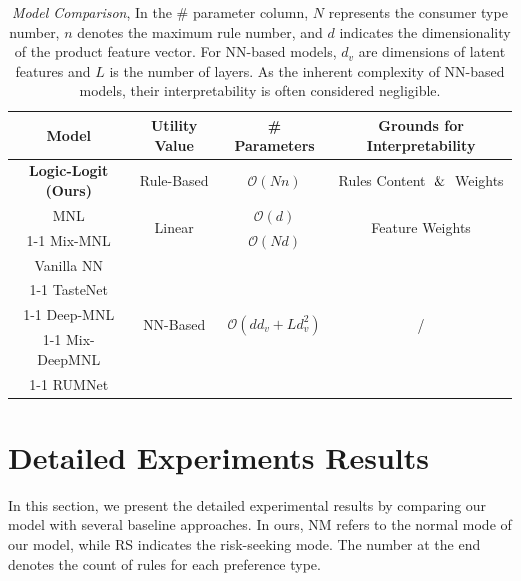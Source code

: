 \documentclass{article} %
\begin{document}
\begin{table}[ht]
\centering
\begin{tabular}{c|c|c|c} 
\toprule
Model & Utility Value  & \# Parameters & Grounds for Interpretability \\ 
\hline
\textbf{Logic-Logit (Ours)}  & Rule-Based & $\mathcal{O}(Nn)$ & Rules Content $\And$ Weights \\
\hline
MNL   & \multirow{2}{*}{Linear} & $\mathcal{O}(d)$ & \multirow{2}{*}{Feature Weights} \\
\cline{1-1} \cline{3-3}
Mix-MNL &  & $\mathcal{O}(Nd)$ & \\
\hline
Vanilla NN & \multirow{6}{*}{NN-Based} & \multirow{6}{*}{$\mathcal{O}(d d_v+L d_v^2)$} & \multirow{6}{*}{/} \\ 
\cline{1-1}
TasteNet & && \\
\cline{1-1}
Deep-MNL & && \\ 
\cline{1-1}
%
%
Mix-DeepMNL & && \\ 
\cline{1-1}
RUMNet & && \\ 
\bottomrule
\end{tabular}
\caption{\textit{Model Comparison}, In the \# parameter column, \( N \) represents the consumer type number, \( n \) denotes the maximum rule number, and \( d \) indicates the dimensionality of the product feature vector. For NN-based models, $d_v$ are dimensions of latent features and $L$ is the number of layers. As the inherent complexity of NN-based models, their interpretability is often considered negligible.}
\label{tab:Model Comparison}
\end{table}


\section{Detailed Experiments Results}
\label{appendix:additional_syn}
In this section, we present the detailed experimental results by comparing our model with several baseline approaches. In ours, NM refers to the normal mode of our model, while RS indicates the risk-seeking mode. The number at the end denotes the count of rules for each preference type.
\end{document}

